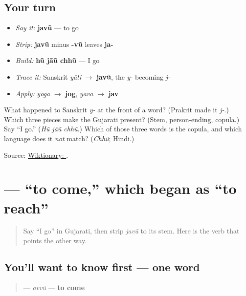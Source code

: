 \subsection*{Your turn}
\begin{itemize}
\raggedright
  \item \emph{Say it:} \textbf{javũ} — to go
  \item \emph{Strip:} \textbf{javũ} minus \textbf{-vũ} leaves \textbf{ja-}
  \item \emph{Build:} \textbf{hũ jāũ chhũ} — I go
  \item \emph{Trace it:} Sanskrit \emph{yāti} $\to$ \textbf{javũ}, the \emph{y-} becoming \emph{j-}
  \item \emph{Apply:} \emph{yoga} $\to$ \textbf{jog}, \emph{yava} $\to$ \textbf{jav}
\end{itemize}

\begin{tcolorbox}[breakable,colback=teal!4,colframe=teal!35!black,title={Before you move on}]
What happened to Sanskrit \emph{y-} at the front of a word? (Prakrit made it \emph{j-}.) Which three pieces make the Gujarati present? (Stem, person-ending, copula.) Say \textquotedblleft{}I go.\textquotedblright{} (\emph{Hũ jāũ chhũ}.) Which of those three words is the copula, and which language does it \emph{not} match? (\emph{Chhũ}; Hindi.)

Source: \href{https://en.wiktionary.org/wiki/\%E0\%AA\%9C\%E0\%AA\%B5\%E0\%AB\%81\%E0\%AA\%82}{Wiktionary: }.
\end{tcolorbox}
\section[āvvũ]{ — \textquotedblleft{}to come,\textquotedblright{} which began as \textquotedblleft{}to reach\textquotedblright{}}

\label{lesson:GU-C07-aavvun}



\begin{quote}
Say \textquotedblleft{}I go\textquotedblright{} in Gujarati, then strip \emph{javũ} to its stem. Here is the verb that points the other way.
\end{quote}

\subsection*{You'll want to know first — one word}
\begin{quote}
\textbf{} — \emph{āvvũ} — \textbf{to come}
\end{quote}

